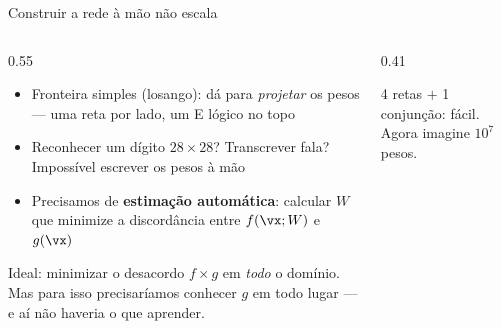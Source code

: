 \documentclass[aspectratio=169, 11pt]{beamer}
\begin{document}
\begin{frame}{Construir a rede à mão não escala}
  \begin{columns}[T]
    \begin{column}{0.55\textwidth}
      \begin{itemize}\setlength{\itemsep}{0.4ex}
        \item Fronteira simples (losango): dá para \emph{projetar} os pesos —
              uma reta por lado, um E lógico no topo
        \item Reconhecer um dígito $28{\times}28$? Transcrever fala?
              \alert{Impossível} escrever os pesos à mão
        \item Precisamos de \textbf{estimação automática}: calcular $W$ que
              minimize a discordância entre $f(\vx; W)$ e $g(\vx)$
      \end{itemize}
      \begin{ideiabox}
        Ideal: minimizar o desacordo $f \times g$ em \emph{todo} o domínio.
        Mas para isso precisaríamos conhecer $g$ em todo lugar — e aí não
        haveria o que aprender.
      \end{ideiabox}
    \end{column}
    \begin{column}{0.41\textwidth}
      \begin{center}
      \end{center}
      \begin{center}
        {\small\color{icCinza} 4 retas $+$ 1 conjunção: fácil.
        Agora imagine $10^7$ pesos.}
      \end{center}
    \end{column}
  \end{columns}
\end{frame}
\end{document}
